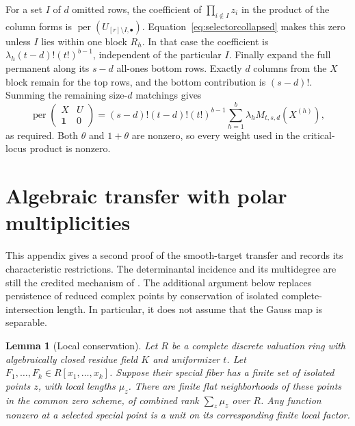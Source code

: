 \documentclass[11pt]{article}
\newtheorem{lemma}[theorem]{Lemma}
\theoremstyle{remark}\newtheorem{remark}[theorem]{Remark}
\DeclareMathOperator{\per}{per}
\begin{document}
For a set $I$ of $d$ omitted rows, the coefficient of
$\prod_{i\notin I}z_i$ in the product of the column forms is
$\per(U_{[r]\setminus I,\bullet})$. Equation~\eqref{eq:selectorcollapsed}
makes this zero unless $I$ lies within one block $R_h$. In that case
the coefficient is
$\lambda_h(t-d)!(t!)^{b-1}$, independent of the particular $I$.
Finally expand the full permanent along its $s-d$ all-ones bottom
rows. Exactly $d$ columns from the $X$ block remain for the top rows,
and the bottom contribution is $(s-d)!$. Summing the remaining
size-$d$ matchings gives
\[
 \per\begin{pmatrix}X&U\\\mathbf1&0\end{pmatrix}
  =(s-d)!(t-d)!(t!)^{b-1}
      \sum_{h=1}^b\lambda_h M_{t,s,d}(X^{(h)}),
\]
as required. Both $\theta$ and $1+\theta$ are nonzero, so every
weight used in the critical-locus product is nonzero.

\section{Algebraic transfer with polar multiplicities}\label{app:algebraic}

This appendix gives a second proof of the smooth-target transfer and
records its characteristic restrictions. The determinantal incidence
and its multidegree are still the credited mechanism of
\cite{Sheshadri}. The additional argument below replaces persistence
of reduced complex points by conservation of isolated
complete-intersection length. In particular, it does not assume that
the Gauss map is separable.

\begin{lemma}[Local conservation]\label{lem:conservation}
Let $R$ be a complete discrete valuation ring with algebraically
closed residue field $K$ and uniformizer $t$. Let
$F_1,\ldots,F_k\in R[x_1,\ldots,x_k]$. Suppose their special fiber
has a finite set of isolated points $z$, with local lengths $\mu_z$.
There are finite flat neighborhoods of these points in the common
zero scheme, of combined rank $\sum_z\mu_z$ over $R$. Any function
nonzero at a selected special point is a unit on its corresponding
finite local factor.
\end{lemma}
\end{document}
